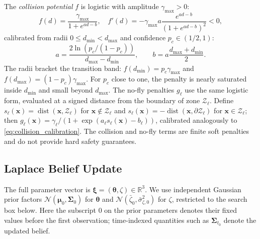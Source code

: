\documentclass{article}
\newcommand{\R}{\mathbb{R}}
\newcommand{\bs}[1]{\boldsymbol{#1}}
\newcommand{\x}{\mathbf{x}}
\begin{document}
The \emph{collision potential} $f$ is logistic with amplitude $\gamma_{\max}>0$:
\begin{equation}
\label{eq:collision_potential}
f(d)=\frac{\gamma_{\max}}{1+e^{ad-b}},\quad
f'(d)=-\gamma_{\max}a\frac{e^{ad-b}}{(1+e^{ad-b})^2}<0,
\end{equation}
calibrated from radii $0\le d_{\min}<d_{\max}$ and confidence $p_c\in(1/2,1)$:
\begin{equation}
\label{eq:collision_calibration}
a=\frac{2\ln(p_c/(1-p_c))}{d_{\max}-d_{\min}},\qquad
b=a\frac{d_{\max}+d_{\min}}{2}.
\end{equation}
The radii bracket the transition band: $f(d_{\min})=p_c\gamma_{\max}$ and $f(d_{\max})=(1-p_c)\gamma_{\max}$.
For $p_c$ close to one, the penalty is nearly saturated inside $d_{\min}$ and small beyond $d_{\max}$.
The no-fly penalties $g_\ell$ use the same logistic form, evaluated at a signed distance from the boundary of zone $\mathcal Z_\ell$.
Define $s_\ell(\x)=\operatorname{dist}(\x,\mathcal Z_\ell)$ for $\x\notin\mathcal Z_\ell$ and $s_\ell(\x)=-\operatorname{dist}(\x,\partial\mathcal Z_\ell)$ for $\x\in\mathcal Z_\ell$; then $g_\ell(\x)=\gamma_\ell/(1+\exp(a_\ell s_\ell(\x)-b_\ell))$, calibrated analogously to \eqref{eq:collision_calibration}.
The collision and no-fly terms are finite soft penalties and do not provide hard safety guarantees.

\subsection{Laplace Belief Update}
\label{sec:belief_update}

The full parameter vector is $\bs\xi=(\bs\theta,\zeta)\in\R^3$.
We use independent Gaussian prior factors $\mathcal N(\bs\mu_0,\bs\Sigma_0)$ for $\bs\theta$ and $\mathcal N(\bar\zeta_0,\bar\sigma_{\zeta,0}^2)$ for $\zeta$, restricted to the search box below.
Here the subscript $0$ on the prior parameters denotes their fixed values before the first observation; time-indexed quantities such as $\bs\Sigma_{t_0}$ denote the updated belief.
\end{document}
